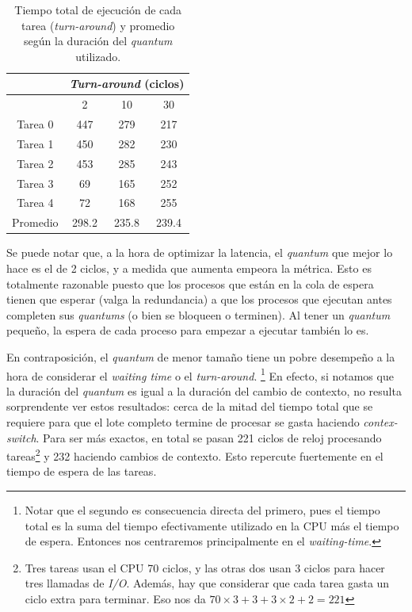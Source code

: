 \begin{table}[H]
  \center
  \begin{center}
  \begin{tabular}{c|c|c|c|}
    \cline{2-4}
    & \multicolumn{3}{|c|}{\cellcolor{LightCyan}\emph{Turn-around} (ciclos)}\\
    \hline
    \rowcolor{LightCyan}
    \multicolumn{1}{|c|}{Quantum} & 2 & 10 & 30 \\
    \hline
    \multicolumn{1}{|c|}{\cellcolor{LightCyan}Tarea 0} & 447 & 279 & 217 \\
    \multicolumn{1}{|c|}{\cellcolor{LightCyan}Tarea 1} & 450 & 282 & 230 \\
    \multicolumn{1}{|c|}{\cellcolor{LightCyan}Tarea 2} & 453 & 285 & 243 \\
    \multicolumn{1}{|c|}{\cellcolor{LightCyan}Tarea 3} & 69 & 165 & 252 \\
    \multicolumn{1}{|c|}{\cellcolor{LightCyan}Tarea 4} & 72 & 168 & 255 \\
    \hline
    \multicolumn{1}{|c|}{\cellcolor{LightCyan}Promedio} & 298.2 & 235.8 & 239.4 \\
    \hline
  \end{tabular}
  \end{center}
  \caption{\footnotesize Tiempo total de ejecución de cada tarea (\emph{turn-around}) y promedio según la duración del \emph{quantum} utilizado.}
  \label{tab:ej5-3}
\end{table}


Se puede notar que, a la hora de optimizar la latencia, el \emph{quantum} que mejor lo hace es el de 2 ciclos, y a medida que aumenta empeora la métrica. Esto es totalmente razonable puesto que los procesos que están en la cola de espera tienen que esperar (valga la redundancia) a que los procesos que ejecutan antes completen sus \emph{quantums} (o bien se bloqueen o terminen). Al tener un \emph{quantum} pequeño, la espera de cada proceso para empezar a ejecutar también lo es.

En contraposición, el \emph{quantum} de menor tamaño tiene un pobre desempeño a la hora de considerar el \emph{waiting time} o el \emph{turn-around}. \footnote{Notar que el segundo es consecuencia directa del primero, pues el tiempo total es la suma del tiempo efectivamente utilizado en la CPU más el tiempo de espera. Entonces nos centraremos principalmente en el \emph{waiting-time}.} En efecto, si notamos que la duración del \emph{quantum} es igual a la duración del cambio de contexto, no resulta sorprendente ver estos resultados: cerca de la mitad del tiempo total que se requiere para que el lote completo termine de procesar se gasta haciendo \emph{contex-switch}. Para ser más exactos, en total se pasan 221 ciclos de reloj procesando tareas\footnote{Tres tareas usan el CPU 70 ciclos, y las otras dos usan 3 ciclos para hacer tres llamadas de \emph{I/O}. Además, hay que considerar que cada tarea gasta un ciclo extra para terminar. Eso nos da $70\times 3 + 3 + 3\times 2 + 2 = 221$} y 232 haciendo cambios de contexto. Esto repercute fuertemente en el tiempo de espera de las tareas.


